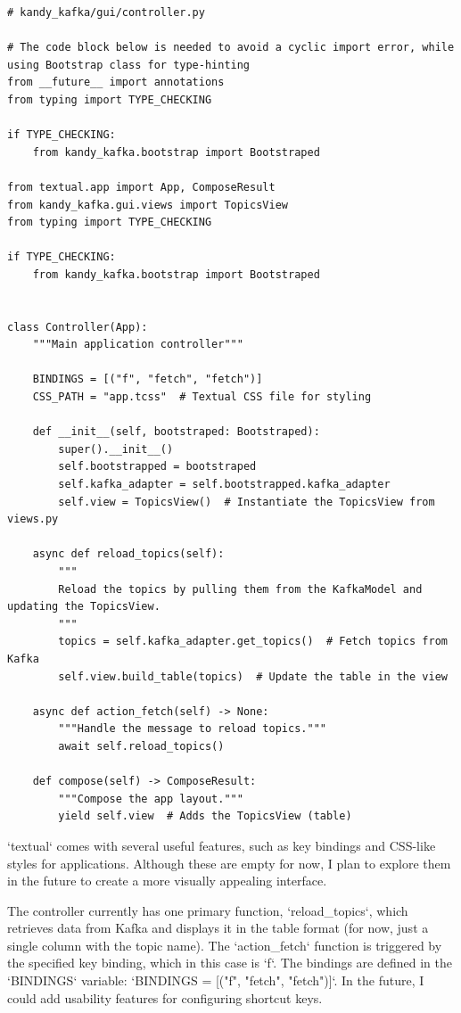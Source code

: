 \documentclass[10pt , a4paper]{report}
\newenvironment{code}{\captionsetup{type=listing}}{}
\begin{document}
\begin{code}
  \begin{verbatim}
# kandy_kafka/gui/controller.py

# The code block below is needed to avoid a cyclic import error, while using Bootstrap class for type-hinting
from __future__ import annotations
from typing import TYPE_CHECKING

if TYPE_CHECKING:
    from kandy_kafka.bootstrap import Bootstraped

from textual.app import App, ComposeResult
from kandy_kafka.gui.views import TopicsView
from typing import TYPE_CHECKING

if TYPE_CHECKING:
    from kandy_kafka.bootstrap import Bootstraped


class Controller(App):
    """Main application controller"""

    BINDINGS = [("f", "fetch", "fetch")]
    CSS_PATH = "app.tcss"  # Textual CSS file for styling

    def __init__(self, bootstraped: Bootstraped):
        super().__init__()
        self.bootstrapped = bootstraped
        self.kafka_adapter = self.bootstrapped.kafka_adapter
        self.view = TopicsView()  # Instantiate the TopicsView from views.py

    async def reload_topics(self):
        """
        Reload the topics by pulling them from the KafkaModel and updating the TopicsView.
        """
        topics = self.kafka_adapter.get_topics()  # Fetch topics from Kafka
        self.view.build_table(topics)  # Update the table in the view

    async def action_fetch(self) -> None:
        """Handle the message to reload topics."""
        await self.reload_topics()

    def compose(self) -> ComposeResult:
        """Compose the app layout."""
        yield self.view  # Adds the TopicsView (table)

  \end{verbatim}
\end{code}

`textual` comes with several useful features, such as key bindings and CSS-like styles for applications. Although these are empty for now, I plan to explore them in the future to create a more visually appealing interface.

The controller currently has one primary function, `reload\_topics`, which retrieves data from Kafka and displays it in the table format (for now, just a single column with the topic name). The `action\_fetch` function is triggered by the specified key binding, which in this case is `f`. The bindings are defined in the `BINDINGS` variable: `BINDINGS = [("f", "fetch", "fetch")]`. In the future, I could add usability features for configuring shortcut keys.
\end{document}
